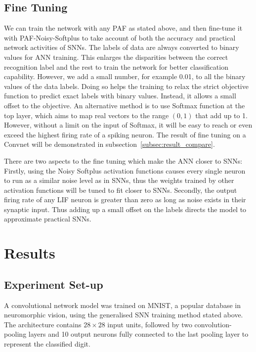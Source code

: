 \documentclass{article}
\begin{document}
	\subsection{Fine Tuning}
	We can train the network with any PAF as stated above, and then fine-tune it with PAF-Noisy-Softplus to take account of both the accuracy and practical network activities of SNNs.
	The labels of data are always converted to binary values for ANN training.
	This enlarges the disparities between the correct recognition label and the rest to train the network for better classification capability.
	However, we add a small number, for example 0.01, to all the binary values of the data labels.
	Doing so helps the training to relax the strict objective function to predict exact labels with binary values.
	Instead, it allows a small offset to the objective.
	An alternative method is to use Softmax function at the top layer, which aims to map real vectors to the range $(0,1)$ that add up to 1. 
	However, without a limit on the input of Softmax, it will be easy to reach or even exceed the highest firing rate of a spiking neuron.
	The result of fine tuning on a Convnet will be demonstrated in subsection~\ref{subsec:result_compare}.
	
	There are two aspects to the fine tuning which make the ANN closer to SNNs:
	Firstly, using the Noisy Softplus activation functions causes every single neuron to run as a similar noise level as in SNNs, thus the weights trained by other activation functions will be tuned to fit closer to SNNs.
	Secondly, the output firing rate of any LIF neuron is greater than zero as long as noise exists in their synaptic input.
	Thus adding up a small offset on the labels directs the model to approximate practical SNNs. 
	
	\section{Results}
	\label{sec:result}
	
	\subsection{Experiment Set-up}
	A convolutional network model was trained on MNIST,
	a popular database in neuromorphic vision, using the generalised SNN training method stated above.
	The architecture contains $28\times28$ input units, followed by two convolution-pooling layers and 10 output neurons fully connected to the last pooling layer to represent the classified digit.
	
\end{document}
